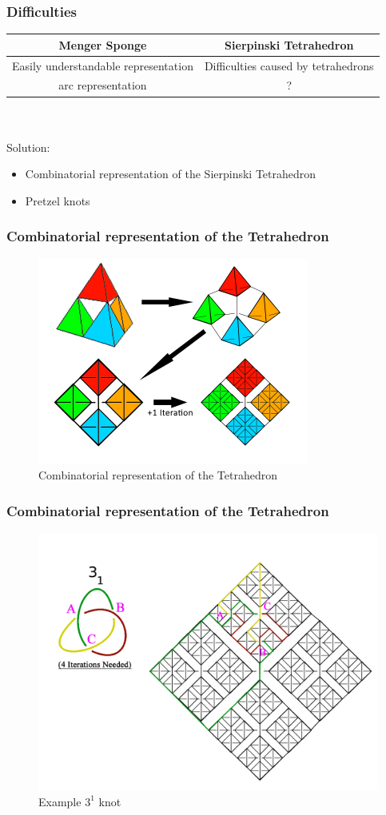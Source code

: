 \begin{frame}
	\frametitle{Difficulties}
	\begin{center}
	\begin{tabular}{|c|c|}
		\hline
		\textbf{Menger Sponge} & \textbf{Sierpinski Tetrahedron} \\
		\hline
		Easily understandable representation  & Difficulties caused by tetrahedrons \\
		\hline
		arc representation & ? \\
		\hline
	\end{tabular}
	\end{center}\\
	\\
	\onslide<2->
	Solution:
	\begin{itemize}
		\item Combinatorial representation of the Sierpinski Tetrahedron
		\item Pretzel knots
	\end{itemize}
\end{frame}

\begin{frame}
	\frametitle{Combinatorial representation of the Tetrahedron} %
	\begin{figure}[h]
		\centering
		\includegraphics[width=0.5\linewidth]{images/CombRep1}
		\caption{Combinatorial representation of the Tetrahedron \cite{broden2024knotsinsidefractals}}
		\label{fig:enter-label}
	\end{figure}
\end{frame}

\begin{frame}
	\frametitle{Combinatorial representation of the Tetrahedron} %
	\begin{figure}[h]
		\centering
		\includegraphics[width=0.5\linewidth]{images/CombRep2}
		\caption{Example $3^1$ knot \cite{broden2024knotsinsidefractals}}
		\label{fig:enter-label}
	\end{figure}
\end{frame}


